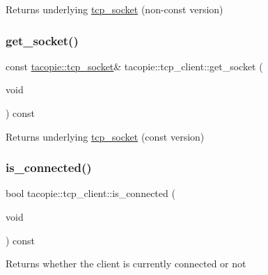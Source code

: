 \begin{DoxyReturn}{Returns}
underlying \hyperlink{classtacopie_1_1tcp__socket}{tcp\+\_\+socket} (non-\/const version) 
\end{DoxyReturn}
\mbox{\label{classtacopie_1_1tcp__client_a9cf1f3ccf43f9a0a883a17b15e3668d6}} 
\subsubsection{\texorpdfstring{get\+\_\+socket()}{get\_socket()}\hspace{0.1cm}{\footnotesize\ttfamily [2/2]}}
{\footnotesize\ttfamily const \hyperlink{classtacopie_1_1tcp__socket}{tacopie\+::tcp\+\_\+socket}\& tacopie\+::tcp\+\_\+client\+::get\+\_\+socket (\begin{DoxyParamCaption}\item[{void}]{ }\end{DoxyParamCaption}) const}

\begin{DoxyReturn}{Returns}
underlying \hyperlink{classtacopie_1_1tcp__socket}{tcp\+\_\+socket} (const version) 
\end{DoxyReturn}
\mbox{\label{classtacopie_1_1tcp__client_a9bf568812c8350260843842e7952c8c3}} 
\subsubsection{\texorpdfstring{is\+\_\+connected()}{is\_connected()}}
{\footnotesize\ttfamily bool tacopie\+::tcp\+\_\+client\+::is\+\_\+connected (\begin{DoxyParamCaption}\item[{void}]{ }\end{DoxyParamCaption}) const}

\begin{DoxyReturn}{Returns}
whether the client is currently connected or not 
\end{DoxyReturn}
\mbox{\label{classtacopie_1_1tcp__client_acb08202e4ea7d85df4a6959dfe418eba}} 
